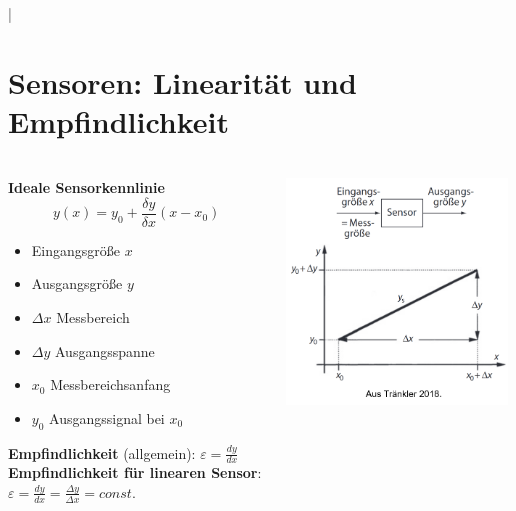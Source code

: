 |\section{Sensoren: Linearität und Empfindlichkeit}
\begin{frame}
    \frametitle{\insertsection}
    \vfill
    \begin{columns}
        \begin{column}[c]{0.6\textwidth}
            \textbf{Ideale Sensorkennlinie}
            \begin{equation*}
                y(x) = y_0 + \frac{\delta y}{\delta x}(x - x_0)
            \end{equation*}

            \begin{itemize}
                \item Eingangsgröße $x$
                \item Ausgangsgröße $y$
                \item $\Delta x$ Messbereich
                \item $\Delta y$ Ausgangsspanne
                \item $x_0$ Messbereichsanfang
                \item $y_0$ Ausgangssignal bei $x_0$ \\  
            \end{itemize}
            \textbf{Empfindlichkeit} (allgemein): $\varepsilon =\frac{d y}{d x}$ \\ 
            \textbf{Empfindlichkeit für linearen Sensor}:\\
             $\varepsilon =  \frac{d y}{d x}=\frac{\Delta  y}{\Delta  x} =const.$\\
        \end{column} 

        \begin{column}[c]{0.6\textwidth}
            \includegraphics[height=6cm]{Abbildung03} 
        \end{column}
           
         
    \end{columns}
    
\end{frame}
